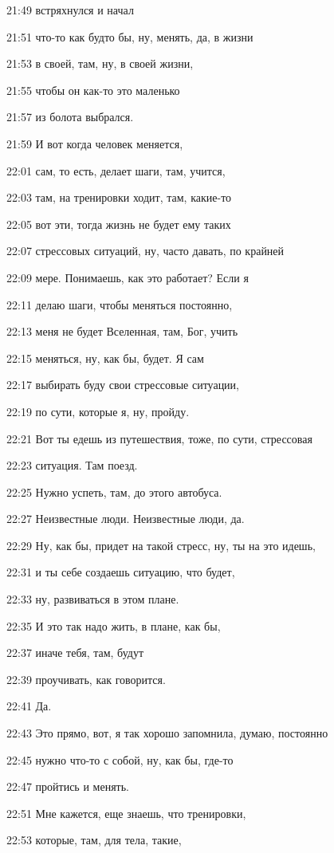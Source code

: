 21:49
встряхнулся и начал

21:51
что-то как будто бы, ну, менять, да, в жизни

21:53
в своей, там, ну, в своей жизни,

21:55
чтобы он как-то это маленько

21:57
из болота выбрался.

21:59
И вот когда человек меняется,

22:01
сам, то есть, делает шаги, там, учится,

22:03
там, на тренировки ходит, там, какие-то

22:05
вот эти, тогда жизнь не будет ему таких

22:07
стрессовых ситуаций, ну, часто давать, по крайней

22:09
мере. Понимаешь, как это работает? Если я

22:11
делаю шаги, чтобы меняться постоянно,

22:13
меня не будет Вселенная, там, Бог, учить

22:15
меняться, ну, как бы, будет. Я сам

22:17
выбирать буду свои стрессовые ситуации,

22:19
по сути, которые я, ну, пройду.

22:21
Вот ты едешь из путешествия, тоже, по сути, стрессовая

22:23
ситуация. Там поезд.

22:25
Нужно успеть, там, до этого автобуса.

22:27
Неизвестные люди. Неизвестные люди, да.

22:29
Ну, как бы, придет на такой стресс, ну, ты на это идешь,

22:31
и ты себе создаешь ситуацию, что будет,

22:33
ну, развиваться в этом плане.

22:35
И это так надо жить, в плане, как бы,

22:37
иначе тебя, там, будут

22:39
проучивать, как говорится.

22:41
Да.

22:43
Это прямо, вот, я так хорошо запомнила, думаю, постоянно

22:45
нужно что-то с собой, ну, как бы, где-то

22:47
пройтись и менять.

22:51
Мне кажется, еще знаешь, что тренировки,

22:53
которые, там, для тела, такие,


